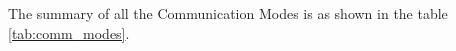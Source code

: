\documentclass[12pt]{book}
\newcommand{\weblink}[2]{\href{#1}{\textcolor{blue}{#2}}}
\begin{document}
The summary of all the Communication Modes is as shown in the table \ref{tab:comm_modes}.





    









\newpage




\end{document}
